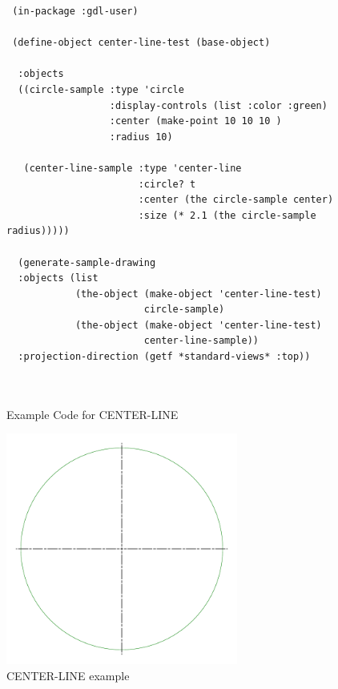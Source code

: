 \documentclass [11pt]{book}
\begin{document}
\begin{itemize}
\begin{figure}
\begin{lrbox}{\boxedverb}
\begin{minipage}{\linewidth}
{\begin{verbatim}
 (in-package :gdl-user)

 (define-object center-line-test (base-object)
 
  :objects 
  ((circle-sample :type 'circle
                  :display-controls (list :color :green)
                  :center (make-point 10 10 10 )
                  :radius 10)
   
   (center-line-sample :type 'center-line
                       :circle? t
                       :center (the circle-sample center)
                       :size (* 2.1 (the circle-sample radius)))))

  (generate-sample-drawing 
  :objects (list 
            (the-object (make-object 'center-line-test) 
                        circle-sample) 
            (the-object (make-object 'center-line-test) 
                        center-line-sample))
  :projection-direction (getf *standard-views* :top))
 
 
\end{verbatim}}
\end{minipage}
\end{lrbox}
\fbox{\usebox{\boxedverb}}

\caption{Example Code for CENTER-LINE}

\label{fig:example-code-CENTER-LINE}

\end{figure}

\begin{figure}
\begin{center}
\includegraphics[width=3in,height=3in]{../images/example-center-line.pdf}
\end{center}

\caption{CENTER-LINE example}

\label{fig:CENTER-LINE}


\end{figure}
\end{itemize}
\end{document}
